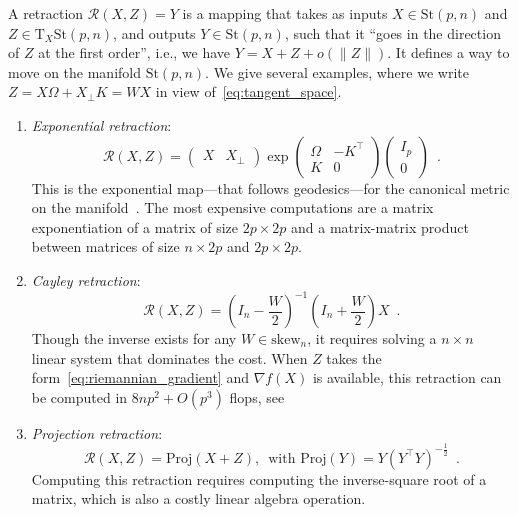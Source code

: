 \documentclass[twoside,11pt]{article}
\newcommand{\stiefel}{{\mathrm{St}(p, n)}}
\newcommand{\sk}{{\mathrm{skew}}}
\newcommand{\tangent}{{\mathrm{T}_X\stiefel}}
\begin{document}
A retraction $\mathcal{R}(X, Z) = Y$ is a mapping that takes as inputs $X\in\stiefel$ and $Z\in\tangent$, and outputs $Y\in \stiefel$, such that it ``goes in the direction of $Z$ at the first order'', i.e.,
we have $Y = X + Z + o(\|Z\|)$. It defines a way to move on the manifold $\stiefel$. We give several examples, where we write $Z =X\Omega + X_{\perp}K = WX$ in view of~\eqref{eq:tangent_space}.
\begin{enumerate}
  \item \emph{Exponential retraction}: \begin{equation}
    \label{eq:exp_retraction}
    \mathcal{R}(X, Z) =   \begin{pmatrix}
    X & X_\perp
  \end{pmatrix}\exp\begin{pmatrix}
    \Omega & -K^\top \\
    K & 0
  \end{pmatrix}
  \begin{pmatrix}
    I_p  \\
    0
  \end{pmatrix}\enspace .
\end{equation}
  This is the exponential map---that follows geodesics---for the canonical metric on the manifold~\citep[(10)]{ZimmermannHueper2022}. The most expensive computations are a matrix exponentiation of a matrix of size $2p\times 2p$ and a matrix-matrix product between matrices of size $n\times 2p$ and $2p\times 2p$.
  \item \emph{Cayley retraction}:
  \begin{equation*}
      \label{eq:cayley_retraction}
      \mathcal{R}(X, Z) = (I_n - \frac{W}{2})^{-1}(I_n + \frac{W}{2}) X  \enspace.
  \end{equation*}
  Though the inverse exists for any $W\in\sk_n$, it requires solving a $n\times n$ linear system that dominates the cost. When $Z$ takes the form~\eqref{eq:riemannian_gradient} and $\nabla f(X)$ is available, this retraction can be computed in $8np^2 + O(p^3)$ flops, see~\citet[\S 2.2]{WenYin2012}
  \item \emph{Projection retraction}:\begin{equation}
    \label{eq:proj_retraction}
    \mathcal{R}(X, Z) = \mathrm{Proj}(X + Z), \enspace \text{with }\mathrm{Proj}(Y) = Y(Y^\top Y)^{-\frac12}\enspace.
\end{equation}
Computing this retraction requires computing the inverse-square root of a matrix, which is also a costly linear algebra operation.
\end{enumerate}
\end{document}
